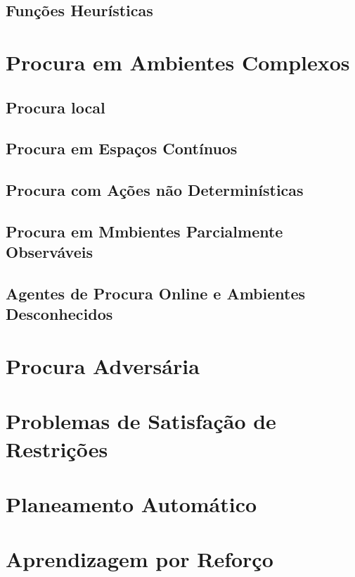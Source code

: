 \documentclass[12pt]{article}
\begin{document}
\newpage

\subsection{Funções Heurísticas}



\newpage

\section{Procura em Ambientes Complexos}



\subsection{Procura local}



\subsection{Procura em Espaços Contínuos}



\subsection{Procura com Ações não Determinísticas}



\subsection{Procura em Mmbientes Parcialmente Observáveis}



\subsection{Agentes de Procura Online e Ambientes Desconhecidos}



\newpage

\section{Procura Adversária}



\newpage

\section{Problemas de Satisfação de Restrições}



\newpage

\section{Planeamento Automático}



\newpage

\section{Aprendizagem por Reforço}
\end{document}
